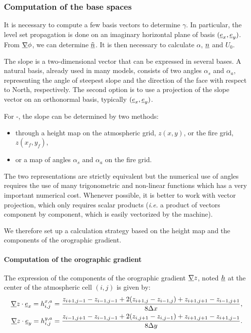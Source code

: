 \subsubsection{Computation of the base spaces}

It is necessary to compute a few basis vectors to determine $\gamma$. In particular, the level set propagation is done on an imaginary horizontal plane of basis $(\underline{e}_x, \underline{e}_y)$.
From $\underline{\nabla} \phi$, we can determine $\underline{\tilde n}$.
It is then necessary to calculate $\alpha$, $\underline{n}$ and $U_0$.

\medskip

The slope is a two-dimensional vector that can be expressed in several bases. A natural basis, already used in many models, consists of two angles $\alpha_s$ and $\alpha_a$, representing the angle of steepest slope and the direction of the face with respect to North, respectively.
The second option is to use a projection of the slope vector on an orthonormal basis, typically $(\underline{e}_x, \underline{e}_y)$.

\medskip

For \MNH-\Blaze, the slope can be determined by two methods:
\begin{itemize}
  \item through a height map on the atmospheric grid, $z(x,y)$, or the fire grid, $z(x_f,y_f)$,
  \item or a map of angles $\alpha_s$ and $\alpha_a$ on the fire grid.
\end{itemize}
The two representations are strictly equivalent but the numerical use of angles requires the use of many trigonometric and non-linear functions which has a very important numerical cost.
Whenever possible, it is better to work with vector projection, which only requires scalar products (\textit{i.e.} a product of vectors component by component, which is easily vectorized by the machine).

We therefore set up a calculation strategy based on the height map and the components of the orographic gradient. 

\paragraph{Computation of the orographic gradient}
The expression of the components of the orographic gradient $\underline{\nabla} z$, noted $\underline{h}$ at the center of the atmospheric cell $(i,j)$ is given by:
\begin{equation}
  \begin{split}
  	\underline{\nabla} z \cdot \underline{e}_x = h_{i,j}^{x,a} &= \frac{ z_{i+1,j-1} - z_{i-1,j-1} + 2 (z_{i+1,j}-z_{i-1,j}) + z_{i+1,j+1} - z_{i-1,j+1}}{8 \Delta x}, \\
  	\underline{\nabla} z \cdot \underline{e}_y = h_{i,j}^{y,a} &= \frac{z_{i-1,j+1} -z_{i-1,j-1} + 2 (z_{i,j+1}-z_{i,j-1}) + z_{i+1,j+1} - z_{i+1,j-1}}{8 \Delta y}. \\
  \end{split}
\end{equation}

